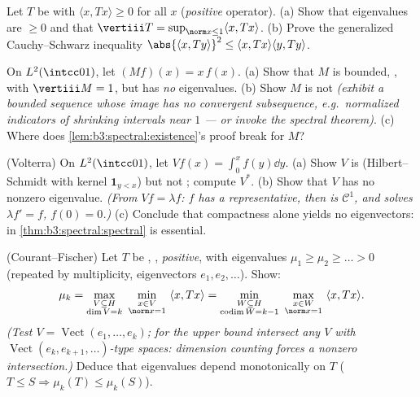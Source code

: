 \begin{exercise}[$\star\star$]\label{exo:b3:spectral:5}
Let $T$ be  with $\langle x, Tx\rangle \geq 0$ for
all $x$ (\emph{positive} operator).
(a) Show that eigenvalues are $\geq 0$ and that $\vertiii T =
\sup_{\norm x\leq1}\langle x, Tx\rangle$.
(b) Prove the generalized Cauchy--Schwarz inequality
$\abs{\langle x, Ty\rangle}^2 \leq \langle x, Tx\rangle\langle
y, Ty\rangle$.
\end{exercise}

\begin{exercise}[$\star\star$]\label{exo:b3:spectral:6}
On $L^2(\intcc01)$, let $(Mf)(x) = x\,f(x)$.
(a) Show that $M$ is bounded, , with $\vertiii M =
1$, but has \emph{no} eigenvalues.
(b) Show $M$ is not  \emph{(exhibit a bounded sequence
whose image has no convergent subsequence, e.g.\ normalized
indicators of shrinking intervals near $1$ --- or invoke the
spectral theorem)}.
(c) Where does \cref{lem:b3:spectral:existence}'s proof break
for $M$?
\end{exercise}

\begin{exercise}[$\star\star$]\label{exo:b3:spectral:7}
(Volterra) On $L^2(\intcc01)$, let $Vf(x) = \int_0^xf(y)\dd
y$.
(a) Show $V$ is  (Hilbert--Schmidt with kernel $\mathbf
1_{y < x}$) but not ; compute $V^*$.
(b) Show that $V$ has no nonzero eigenvalue. \emph{(From $Vf =
\lambda f$: $f$ has a  representative, then is
$\mathcal C^1$, and solves $\lambda f' = f$, $f(0) = 0$.)}
(c) Conclude that compactness alone yields no eigenvectors:
 in \cref{thm:b3:spectral:spectral} is
essential.
\end{exercise}

\begin{exercise}[$\star\star\star$]\label{exo:b3:spectral:8}
(Courant--Fischer) Let $T$ be , ,
\emph{positive}, with eigenvalues $\mu_1 \geq \mu_2 \geq \dots
> 0$ (repeated by multiplicity, eigenvectors $e_1, e_2,
\dots$). Show:
\[
\mu_{k} = \max_{\substack{V \subseteq H \\ \dim V = k}}\
\min_{\substack{x \in V\\ \norm x = 1}}\ \langle x, Tx\rangle
= \min_{\substack{W \subseteq H\\ \operatorname{codim}W =
k-1}}\ \max_{\substack{x\in W\\ \norm x = 1}}\ \langle x,
Tx\rangle .
\]
\emph{(Test $V = \operatorname{Vect}(e_1,\dots,e_k)$; for the
upper bound intersect any $V$ with
$\operatorname{Vect}(e_k, e_{k+1}, \dots)$-type spaces:
dimension counting forces a nonzero intersection.)} Deduce
that eigenvalues depend monotonically on $T$ ($T \leq S
\Rightarrow \mu_k(T) \leq \mu_k(S)$).
\end{exercise}

